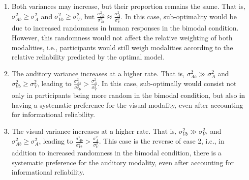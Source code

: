\documentclass[english,floatsintext,man]{apa6}
\theoremstyle{definition}
\theoremstyle{definition}
\theoremstyle{definition}
\theoremstyle{remark}
\begin{document}
\begin{enumerate}
\def\labelenumi{\arabic{enumi})}
\item
  Both variances may increase, but their proportion remains the same.
  That is, \(\sigma^2_{Ab} \geqslant \sigma^2_{A}\) and
  \(\sigma^2_{Vb} \geqslant \sigma^2_{V}\), but
  \(\frac{\sigma^2_{Ab}}{\sigma^2_{Vb}} \approx \frac{\sigma^2_{A}}{\sigma^2_{V}}\).
  In this case, sub-optimality would be due to increased randomness in
  human responses in the bimodal condition. However, this randomness
  would not affect the relative weighting of both modalities, i.e.,
  participants would still weigh modalities according to the relative
  reliability predicted by the optimal model.
\item
  The auditory variance increases at a higher rate. That is,
  \(\sigma^2_{Ab} \gg \sigma^2_{A}\) and
  \(\sigma^2_{Vb} \geqslant \sigma^2_{V}\), leading to
  \(\frac{\sigma^2_{Ab}}{\sigma^2_{Vb}} > \frac{\sigma^2_{A}}{\sigma^2_{V}}\).
  In this case, sub-optimally would consist not only in participants
  being more random in the bimodal condition, but also in having a
  systematic preference for the visual modality, even after accounting
  for informational reliability.
\item
  The visual variance increases at a higher rate. That is,
  \(\sigma^2_{Vb} \gg \sigma^2_{V}\), and
  \(\sigma^2_{Ab} \geqslant \sigma^2_{A}\), leading to
  \(\frac{\sigma^2_{Ab}}{\sigma^2_{Vb}} > \frac{\sigma^2_{A}}{\sigma^2_{V}}\).
  This case is the reverse of case 2, i.e., in addition to increased
  randomness in the bimodal condition, there is a systematic preference
  for the auditory modality, even after accounting for informational
  reliability.
\end{enumerate}
\end{document}
